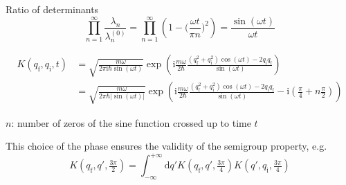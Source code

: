 \documentclass[t,dvipsnames]{beamer}
\begin{document}
\begin{frame}[c]{Ratio of determinants}
 \begin{displaymath}
  \prod_{n=1}^\infty\frac{\lambda_n}{\lambda_n^{(0)}}
     = \prod_{n=1}^\infty\left(1-\big(\frac{\omega t}{\pi n}\big)^2\right)
     = \frac{\sin(\omega t)}{\omega t}
 \end{displaymath}

 \vspace{0.3truecm}
 \begin{footnotesize}
  \begin{displaymath}
   \begin{aligned}
     K(q_\text{f}, q_\text{i}, t) &= \sqrt{\frac{m\omega}{2\pi\text{i}\hbar\sin(\omega t)}}
         \exp\left(\text{i}\frac{m\omega}{2\hbar}\frac{(q_\text{f}^2+q_\text{i}^2)\cos(\omega t)
		      -2q_\text{i}q_\text{f}}{\sin(\omega t)}\right)\\
      &= \sqrt{\frac{m\omega}{2\pi\hbar\vert{\sin(\omega t)}\vert}}
         \exp\left(\text{i}\frac{m\omega}{2\hbar}\frac{(q_\text{f}^2+q_\text{i}^2)\cos(\omega t)
         -2q_\text{i}q_\text{f}}{\sin(\omega t)}-\text{i}\left(\frac{\pi}{4}+n\frac{\pi}{2}\right)\right)
   \end{aligned}
  \end{displaymath}

  $n$: number of zeros of the sine function crossed up to time $t$
 \end{footnotesize}

 \vspace{0.3truecm}
 This choice of the phase ensures the validity of the semigroup property, e.g.
 \begin{displaymath}
  K(q_\text{f}, q', \tfrac{3\pi}{2}) = \int_{-\infty}^{+\infty}\text{d}q'
	     K(q_\text{f}, q', \tfrac{3\pi}{4})K(q', q_\text{i}, \tfrac{3\pi}{4})
 \end{displaymath}
\end{frame}
\end{document}
